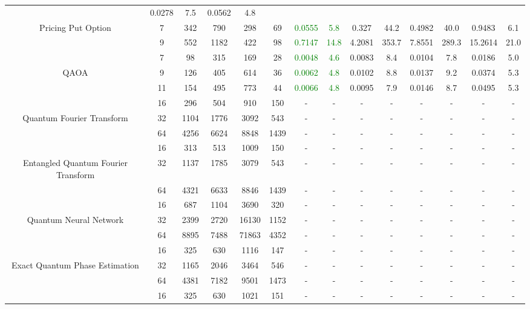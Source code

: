 \begin{table}[htb]
{\begin{tabular}{|c|c|c|c|c|c|c|c|c|c|c|c|c|c|}
 & 0.0278 & 7.5
 & 0.0562 & 4.8
 \\
Pricing Put Option & 
7 & 342 & 790 & 298 & 69
 & \textcolor{green}{0.0555} & \textcolor{green}{5.8}
 & 0.327 & 44.2
 & 0.4982 & 40.0
 & 0.9483 & 6.1
 \\
 & 
9 & 552 & 1182 & 422 & 98
 & \textcolor{green}{0.7147} & \textcolor{green}{14.8}
 & 4.2081 & 353.7
 & 7.8551 & 289.3
 & 15.2614 & 21.0
 \\
\hline
 & 
7 & 98 & 315 & 169 & 28
 & \textcolor{green}{0.0048} & \textcolor{green}{4.6}
 & 0.0083 & 8.4
 & 0.0104 & 7.8
 & 0.0186 & 5.0
 \\
QAOA & 
9 & 126 & 405 & 614 & 36
 & \textcolor{green}{0.0062} & \textcolor{green}{4.8}
 & 0.0102 & 8.8
 & 0.0137 & 9.2
 & 0.0374 & 5.3
 \\
 & 
11 & 154 & 495 & 773 & 44
 & \textcolor{green}{0.0066} & \textcolor{green}{4.8}
 & 0.0095 & 7.9
 & 0.0146 & 8.7
 & 0.0495 & 5.3
 \\
\hline
 & 
16 & 296 & 504 & 910 & 150
 & - & -
 & - & -
 & - & -
 & - & -
 \\
Quantum Fourier Transform & 
32 & 1104 & 1776 & 3092 & 543
 & - & -
 & - & -
 & - & -
 & - & -
 \\
 & 
64 & 4256 & 6624 & 8848 & 1439
 & - & -
 & - & -
 & - & -
 & - & -
 \\
\hline
 & 
16 & 313 & 513 & 1009 & 150
 & - & -
 & - & -
 & - & -
 & - & -
 \\
Entangled Quantum Fourier Transform & 
32 & 1137 & 1785 & 3079 & 543
 & - & -
 & - & -
 & - & -
 & - & -
 \\
 & 
64 & 4321 & 6633 & 8846 & 1439
 & - & -
 & - & -
 & - & -
 & - & -
 \\
\hline
 & 
16 & 687 & 1104 & 3690 & 320
 & - & -
 & - & -
 & - & -
 & - & -
 \\
Quantum Neural Network & 
32 & 2399 & 2720 & 16130 & 1152
 & - & -
 & - & -
 & - & -
 & - & -
 \\
 & 
64 & 8895 & 7488 & 71863 & 4352
 & - & -
 & - & -
 & - & -
 & - & -
 \\
\hline
 & 
16 & 325 & 630 & 1116 & 147
 & - & -
 & - & -
 & - & -
 & - & -
 \\
Exact Quantum Phase Estimation & 
32 & 1165 & 2046 & 3464 & 546
 & - & -
 & - & -
 & - & -
 & - & -
 \\
 & 
64 & 4381 & 7182 & 9501 & 1473
 & - & -
 & - & -
 & - & -
 & - & -
 \\
\hline
 & 
16 & 325 & 630 & 1021 & 151
 & - & -
 & - & -
 & - & -
 & - & -
 \\

\end{tabular}}
\end{table}
